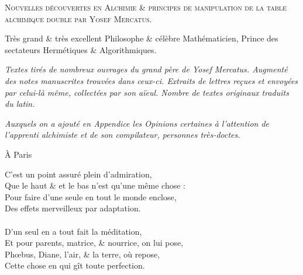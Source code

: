 \newpage

\thispagestyle{empty}

\newlength{\savedparindent}
\setlength{\savedparindent}{\parindent}

\setlength{\parindent}{-4em}


\fontsize{25pt}{25pt}\selectfont{}
\textsc{Nouvelles découvertes en Alchimie \& principes de manipulation de la
table alchimique double par Yosef Mercatus.}

\vspace*{1cm}

\fontsize{20pt}{20pt}\selectfont{}
Très grand \& très excellent Philosophe \& célèbre Mathématicien, Prince des
sectateurs Hermétiques \& Algorithmiques.

\vspace*{1cm}

\textit{Textes tirés de nombreux ouvrages du grand père de Yosef Mercatus.
Augmenté des notes manuscrites trouvées dans ceux-ci.  Extraits de lettres
reçues et envoyées par celui-là même, collectées par son aïeul.  Nombre de
textes originaux traduits du latin.  }

\textit{Auxquels on a ajouté en Appendice les Opinions certaines à l'attention
de l'apprenti alchimiste et de son compilateur, personnes très-doctes.}

\setlength{\parindent}{\savedparindent}

\begin{flushright}
À Paris
\end{flushright}

\newpage

\normalsize

\noindent{}C'est un point assuré plein d'admiration,\\
Que le haut \& et le bas n'est qu'une même chose :\\
Pour faire d'une seule en tout le monde enclose,\\
Des effets merveilleux par adaptation.\\
\\
D'un seul en a tout fait la méditation,\\
Et pour parents, matrice, \& nourrice, on lui pose,\\
Phœbus, Diane, l'air, \& la terre, où repose,\\
Cette chose en qui gît toute perfection.\\

